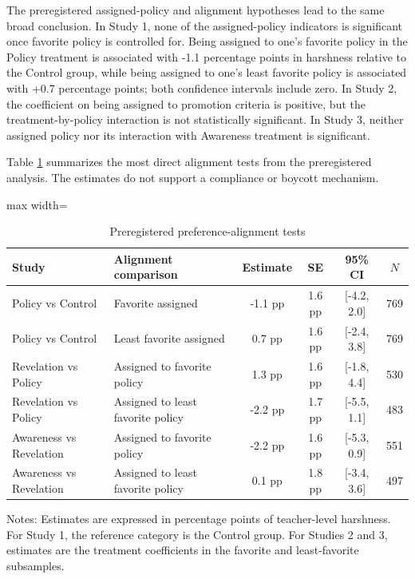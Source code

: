 \documentclass[12pt,a4paper]{article}
\newcommand{\ci}[2]{[#1, #2]}
\begin{document}
The preregistered assigned-policy and alignment hypotheses lead to the same broad conclusion. In Study 1, none of the assigned-policy indicators is significant once favorite policy is controlled for. Being assigned to one's favorite policy in the Policy treatment is associated with -1.1 percentage points in harshness relative to the Control group, while being assigned to one's least favorite policy is associated with +0.7 percentage points; both confidence intervals include zero. In Study 2, the coefficient on being assigned to promotion criteria is positive, but the treatment-by-policy interaction is not statistically significant. In Study 3, neither assigned policy nor its interaction with Awareness treatment is significant.

Table \ref{tab:align_prereg} summarizes the most direct alignment tests from the preregistered analysis. The estimates do not support a compliance or boycott mechanism.

\begin{table}[!htbp]
\centering
\caption{Preregistered preference-alignment tests}
\label{tab:align_prereg}
\begin{threeparttable}
\begin{adjustbox}{max width=\textwidth}
\begin{tabular}{llcccc}
\toprule
Study & Alignment comparison & Estimate & SE & 95\% CI & \(N\) \\
\midrule
Policy vs Control & Favorite assigned & -1.1 pp & 1.6 pp & \ci{-4.2}{2.0} & 769 \\
Policy vs Control & Least favorite assigned & 0.7 pp & 1.6 pp & \ci{-2.4}{3.8} & 769 \\
Revelation vs Policy & Assigned to favorite policy & 1.3 pp & 1.6 pp & \ci{-1.8}{4.4} & 530 \\
Revelation vs Policy & Assigned to least favorite policy & -2.2 pp & 1.7 pp & \ci{-5.5}{1.1} & 483 \\
Awareness vs Revelation & Assigned to favorite policy & -2.2 pp & 1.6 pp & \ci{-5.3}{0.9} & 551 \\
Awareness vs Revelation & Assigned to least favorite policy & 0.1 pp & 1.8 pp & \ci{-3.4}{3.6} & 497 \\
\bottomrule
\end{tabular}
\end{adjustbox}
\begin{tablenotes}[flushleft]
\footnotesize
\item Notes: Estimates are expressed in percentage points of teacher-level harshness. For Study 1, the reference category is the Control group. For Studies 2 and 3, estimates are the treatment coefficients in the favorite and least-favorite subsamples.
\end{tablenotes}
\end{threeparttable}
\end{table}
\end{document}
